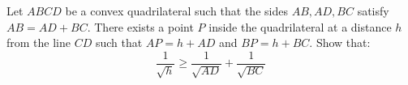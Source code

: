 Let $ ABCD$ be a convex quadrilateral such that the sides $ AB, AD, BC$ satisfy $ AB = AD + BC.$ There exists a point $ P$ inside the quadrilateral at a distance $ h$ from the line $ CD$ such that $ AP = h + AD$  and $ BP = h + BC$.
Show that: \[ \frac {1}{\sqrt {h}} \geq \frac {1}{\sqrt {AD}} + \frac {1}{\sqrt {BC}} \]
